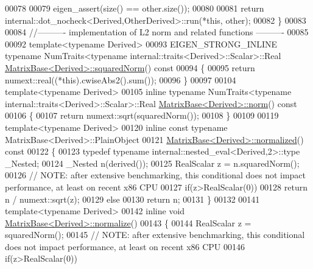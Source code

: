 \begin{DoxyCode}
00078   
00079   eigen\_assert(size() == other.size());
00080 
00081   \textcolor{keywordflow}{return} internal::dot\_nocheck<Derived,OtherDerived>::run(*\textcolor{keyword}{this}, other);
00082 \}
00083 
00084 \textcolor{comment}{//---------- implementation of L2 norm and related functions ----------}
00085 
00092 \textcolor{keyword}{template}<\textcolor{keyword}{typename} Derived>
00093 EIGEN\_STRONG\_INLINE \textcolor{keyword}{typename} NumTraits<typename internal::traits<Derived>::Scalar>::Real 
      \hyperlink{group___core___module_a8782faeb21e43908cdce47cec06fba23}{MatrixBase<Derived>::squaredNorm}()\textcolor{keyword}{ const}
00094 \textcolor{keyword}{}\{
00095   \textcolor{keywordflow}{return} numext::real((*this).cwiseAbs2().sum());
00096 \}
00097 
00104 \textcolor{keyword}{template}<\textcolor{keyword}{typename} Derived>
00105 \textcolor{keyword}{inline} \textcolor{keyword}{typename} NumTraits<typename internal::traits<Derived>::Scalar>::Real 
      \hyperlink{group___core___module_a196c4ec3c8ffdf5bda45d0f617154975}{MatrixBase<Derived>::norm}()\textcolor{keyword}{ const}
00106 \textcolor{keyword}{}\{
00107   \textcolor{keywordflow}{return} numext::sqrt(squaredNorm());
00108 \}
00109 
00119 \textcolor{keyword}{template}<\textcolor{keyword}{typename} Derived>
00120 \textcolor{keyword}{inline} \textcolor{keyword}{const} \textcolor{keyword}{typename} MatrixBase<Derived>::PlainObject
00121 \hyperlink{group___core___module_a5cf2fd4c57e59604fd4116158fd34308}{MatrixBase<Derived>::normalized}()\textcolor{keyword}{ const}
00122 \textcolor{keyword}{}\{
00123   \textcolor{keyword}{typedef} \textcolor{keyword}{typename} internal::nested\_eval<Derived,2>::type \_Nested;
00124   \_Nested n(derived());
00125   RealScalar z = n.squaredNorm();
00126   \textcolor{comment}{// NOTE: after extensive benchmarking, this conditional does not impact performance, at least on recent
       x86 CPU}
00127   \textcolor{keywordflow}{if}(z>RealScalar(0))
00128     \textcolor{keywordflow}{return} n / numext::sqrt(z);
00129   \textcolor{keywordflow}{else}
00130     \textcolor{keywordflow}{return} n;
00131 \}
00132 
00141 \textcolor{keyword}{template}<\textcolor{keyword}{typename} Derived>
00142 \textcolor{keyword}{inline} \textcolor{keywordtype}{void} \hyperlink{group___core___module_ad16303c47ba36f7a41ea264cb26bceb6}{MatrixBase<Derived>::normalize}()
00143 \{
00144   RealScalar z = squaredNorm();
00145   \textcolor{comment}{// NOTE: after extensive benchmarking, this conditional does not impact performance, at least on recent
       x86 CPU}
00146   \textcolor{keywordflow}{if}(z>RealScalar(0))

\end{DoxyCode}
